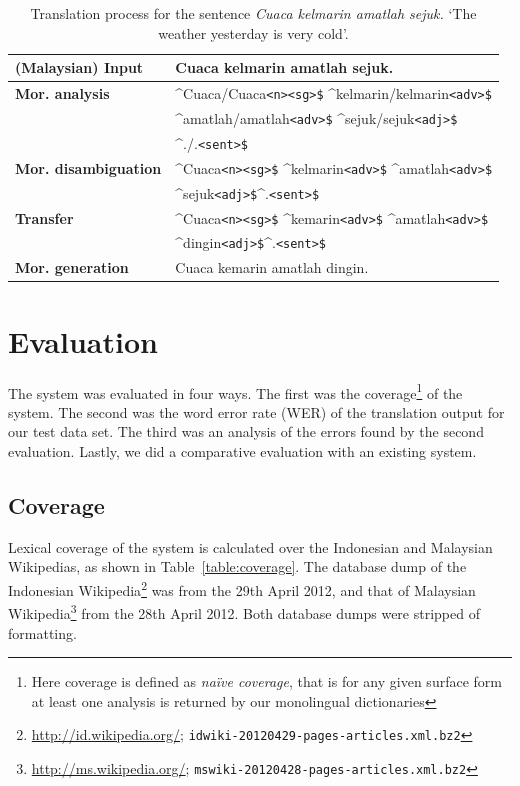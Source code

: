 \documentclass[10pt,a5paper,twoside]{article}
\newcommand{\tag}[1]{{\small{\texttt{#1}}}}
\begin{document}
\begin{table}[htbp]
\centering
\begin{tabular}{ll}
\toprule
{\bf (Malaysian) Input} & Cuaca kelmarin amatlah sejuk. \\ 
\midrule
{\bf Mor. analysis} & \^{}Cuaca/Cuaca\tag{<n>}\tag{<sg>\$} \^{}kelmarin/kelmarin\tag{<adv>\$}\\
~ & \^{}amatlah/amatlah\tag{<adv>\$} \^{}sejuk/sejuk\tag{<adj>\$}\\
~ & \^{}./.\tag{<sent>\$}\\
\midrule
{\bf Mor. disambiguation}& \^{}Cuaca\tag{<n>}\tag{<sg>\$} \^{}kelmarin\tag{<adv>\$} \^{}amatlah\tag{<adv>\$}\\
~ & \^{}sejuk\tag{<adj>\$}\^{}.\tag{<sent>\$} \\
\midrule
{\bf Transfer}& \^{}Cuaca\tag{<n>}\tag{<sg>\$} \^{}kemarin\tag{<adv>\$} \^{}amatlah\tag{<adv>\$}\\
~ & \^{}dingin\tag{<adj>\$}\^{}.\tag{<sent>\$} \\ 
\midrule
{\bf Mor. generation} & Cuaca kemarin amatlah dingin. \\
\bottomrule
\end{tabular}
 \caption{Translation process for the sentence \emph{Cuaca kelmarin amatlah sejuk.} `The weather yesterday is very cold'.}
\end{table}

\section{Evaluation}
The system was evaluated in four ways. The first was the coverage\footnote{Here coverage is defined as \emph{na\"ive coverage}, that is for any given surface form at least one analysis is returned by our monolingual dictionaries} of the system. The second was the word error rate (WER) of the translation output for our test data set. The third was an analysis of the errors found by the second evaluation. Lastly, we did a comparative evaluation with an existing system.

\subsection{Coverage}
Lexical coverage of the system is calculated over the Indonesian and Malaysian Wikipedias, as shown in Table~\ref{table:coverage}. The database dump of the Indonesian Wikipedia\footnote{\url{http://id.wikipedia.org/}; \texttt{idwiki-20120429-pages-articles.xml.bz2}} was from the 29th April 2012, and that of Malaysian Wikipedia\footnote{\url{http://ms.wikipedia.org/}; \texttt{mswiki-20120428-pages-articles.xml.bz2}} from the 28th April 2012. Both database dumps were stripped of formatting.
\end{document}
